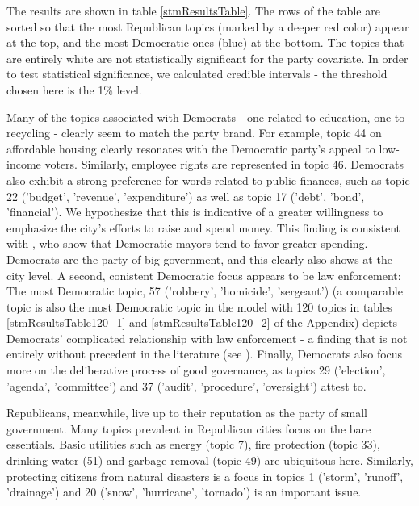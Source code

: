 \documentclass[11pt]{article}
\begin{document}
The results are shown in table \ref{stmResultsTable}. The rows of the table are sorted so that the most Republican topics (marked by a deeper red color) appear at the top, and the most Democratic ones (blue) at the bottom. The topics that are entirely white are not statistically significant for the party covariate. In order to test statistical significance, we calculated credible intervals - the threshold chosen here is the 1\% level.

Many of the topics associated with Democrats - one related to education, one to recycling  - clearly seem to match the party brand. For example, topic 44 on affordable housing clearly resonates with the Democratic party's appeal to low-income voters. Similarly, employee rights are represented in topic 46. Democrats also exhibit a strong preference for words related to public finances, such as topic 22 ('budget', 'revenue', 'expenditure') as well as topic 17 ('debt', 'bond', 'financial'). We hypothesize that this is indicative of a greater willingness to emphasize the city's efforts to raise and spend money. This finding is consistent with \citep{Einstein2015}, who show that Democratic mayors tend to favor greater spending. Democrats are the party of big government, and this clearly also shows at the city level. A second, conistent Democratic focus appears to be law enforcement: The most Democratic topic, 57 ('robbery', 'homicide', 'sergeant') (a comparable topic is also the most Democratic topic in the model with 120 topics in tables \ref{stmResultsTable120_1} and \ref{stmResultsTable120_2} of the Appendix) depicts Democrats' complicated relationship with law enforcement - a finding that is not entirely without precedent in the literature (see \citep{Einstein2015}). Finally, Democrats also focus more on the deliberative process of good governance, as topics 29 ('election', 'agenda', 'committee') and 37 ('audit', 'procedure', 'oversight') attest to.

Republicans, meanwhile, live up to their reputation as the party of small government. Many topics prevalent in Republican cities focus on the bare essentials. Basic utilities such as energy (topic 7), fire protection (topic 33), drinking water (51) and garbage removal (topic 49) are ubiquitous here. Similarly, protecting citizens from natural disasters is a focus in topics 1 ('storm', 'runoff', 'drainage') and 20 ('snow', 'hurricane', 'tornado') is an important issue.



\end{document}
